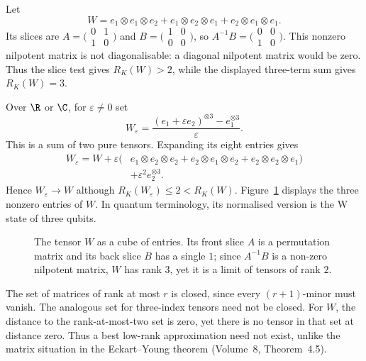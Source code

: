 \begin{example}\label{linear:exa:wtensor}
Let
\[
W=e_1\otimes e_1\otimes e_2+e_1\otimes e_2\otimes e_1+e_2\otimes e_1\otimes e_1.
\]
Its slices are $A=\bigl(\begin{smallmatrix}0&1\\1&0\end{smallmatrix}\bigr)$ and $B=\bigl(\begin{smallmatrix}1&0\\0&0\end{smallmatrix}\bigr)$, so
$A^{-1}B=\bigl(\begin{smallmatrix}0&0\\1&0\end{smallmatrix}\bigr)$. This nonzero nilpotent matrix is not diagonalisable: a diagonal nilpotent matrix would be zero. Thus the slice test gives $R_K(W)>2$, while the displayed three-term sum gives $R_K(W)=3$.

Over $\R$ or $\C$, for $\varepsilon\ne0$ set
\[
W_\varepsilon=\frac{(e_1+\varepsilon e_2)^{\otimes3}-e_1^{\otimes3}}{\varepsilon}.
\]
This is a sum of two pure tensors. Expanding its eight entries gives
\[
\begin{aligned}
W_\varepsilon=W+\varepsilon(&e_1\otimes e_2\otimes e_2
 +e_2\otimes e_1\otimes e_2
 +e_2\otimes e_2\otimes e_1)\\
 &+\varepsilon^2 e_2^{\otimes3}.
\end{aligned}
\]
Hence $W_\varepsilon\to W$ although $R_K(W_\varepsilon)\le2<R_K(W)$. Figure~\ref{linear:fig:wtensor} displays the three nonzero entries of $W$. In quantum terminology, its normalised version is the W state of three qubits.
\end{example}

\begin{figure}[ht]
\centering
{}
\caption{The tensor $W$ as a cube of entries. Its front slice $A$ is a permutation matrix and its back slice $B$ has a single
$1$; since $A^{-1}B$ is a non-zero nilpotent matrix, $W$ has rank $3$, yet it is a limit of tensors of rank $2$.}
\label{linear:fig:wtensor}
\end{figure}

The set of matrices of rank at most $r$ is closed, since every $(r+1)$-minor must vanish. The analogous set for three-index tensors need not be closed. For $W$, the distance to the rank-at-most-two set is zero, yet there is no tensor in that set at distance zero. Thus a best low-rank approximation need not exist, unlike the matrix situation in the Eckart--Young theorem (Volume~8, Theorem~4.5).

